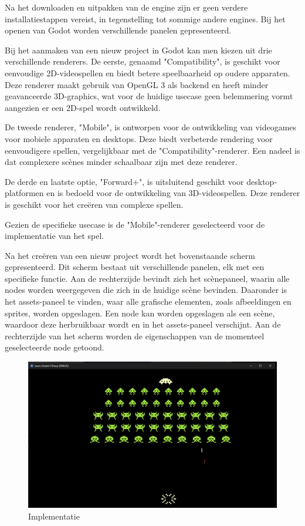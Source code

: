 Na het downloaden en uitpakken van de engine zijn er geen verdere installatiestappen vereist, in tegenstelling tot sommige andere engines. Bij het openen van Godot worden verschillende panelen gepresenteerd.

Bij het aanmaken van een nieuw project in Godot kan men kiezen uit drie verschillende renderers. De eerste, genaamd "Compatibility", is geschikt voor eenvoudige 2D-videospellen en biedt betere speelbaarheid op oudere apparaten. Deze renderer maakt gebruik van OpenGL 3 als backend en heeft minder geavanceerde 3D-graphics, wat voor de huidige usecase geen belemmering vormt aangezien er een 2D-spel wordt ontwikkeld.

De tweede renderer, "Mobile", is ontworpen voor de ontwikkeling van videogames voor mobiele apparaten en desktops. Deze biedt verbeterde rendering voor eenvoudigere spellen, vergelijkbaar met de "Compatibility"-renderer. Een nadeel is dat complexere scènes minder schaalbaar zijn met deze renderer.

De derde en laatste optie, "Forward+", is uitsluitend geschikt voor desktop-platformen en is bedoeld voor de ontwikkeling van 3D-videospellen. Deze renderer is geschikt voor het creëren van complexe spellen.

Gezien de specifieke usecase is de "Mobile"-renderer geselecteerd voor de implementatie van het spel.

Na het creëren van een nieuw project wordt het bovenstaande scherm gepresenteerd. Dit scherm bestaat uit verschillende panelen, elk met een specifieke functie. Aan de rechterzijde bevindt zich het scènepaneel, waarin alle nodes worden weergegeven die zich in de huidige scène bevinden. Daaronder is het assets-paneel te vinden, waar alle grafische elementen, zoals afbeeldingen en sprites, worden opgeslagen. Een node kan worden opgeslagen als een scène, waardoor deze herbruikbaar wordt en in het assets-paneel verschijnt. Aan de rechterzijde van het scherm worden de eigenschappen van de momenteel geselecteerde node getoond.

\begin{figure}[h]
    \centering
    \includegraphics[width=1\textwidth]{ImplementatieSpel.png}
    \caption{Implementatie}
    \label{fig:POC}
\end{figure}

